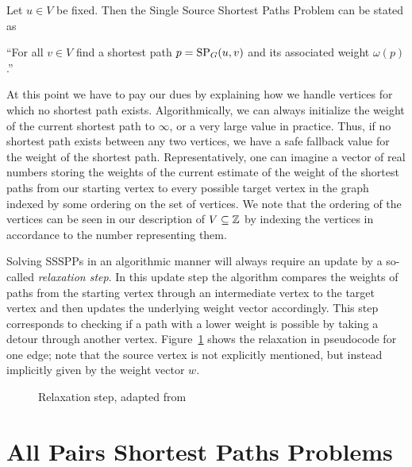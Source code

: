 \begin{definition}\label{def:ssspps}
    Let $u \in V$ be fixed. Then the Single Source Shortest Paths Problem can be stated as
    \begin{displayquote}
        ``For all $v \in V$ find a shortest path $p = \operatorname{SP}_G(u, v)$ and its associated weight $\omega(p)$.''
    \end{displayquote}
\end{definition}

At this point we have to pay our dues by explaining how we handle vertices for which no shortest path exists.
Algorithmically, we can always initialize the weight of the current shortest path to $\infty$, or a very large value in practice.
Thus, if no shortest path exists between any two vertices, we have a safe fallback value for the weight of the shortest path.
Representatively, one can imagine a vector of real numbers storing the weights of the current estimate of the weight of the shortest paths from our starting vertex to every possible target vertex in the graph indexed by some ordering on the set of vertices.
We note that the ordering of the vertices can be seen in our description of $V \subseteq \mathbb{Z}$ by indexing the vertices in accordance to the number representing them.

Solving SSSPPs in an algorithmic manner will always require an update by a so-called \emph{relaxation step}.
In this update step the algorithm compares the weights of paths from the starting vertex through an intermediate vertex to the target vertex and then updates the underlying weight vector accordingly.
This step corresponds to checking if a path with a lower weight is possible by taking a detour through another vertex.
Figure~\ref{alg:relaxation} shows the relaxation in pseudocode for one edge; note that the source vertex is not explicitly mentioned, but instead implicitly given by the weight vector $w$.

\begin{figure}[ht]
    \centering
    \begin{minipage}{.4\textwidth}
        \begin{algorithm}[H]
        \end{algorithm}
    \end{minipage}
    \caption{Relaxation step, adapted from~\cite[Chapter~24]{Cormen2001}}\label{alg:relaxation}
\end{figure}


\section{All Pairs Shortest Paths Problems}

